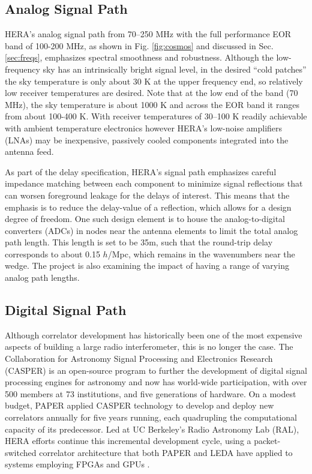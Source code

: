 \documentclass[preprint,11pt]{aastex}
\newcommand{\Mycitep}[1]{\citep{#1}}
\begin{document}
\subsection{Analog Signal Path}
HERA's analog signal path from 70--250 MHz with the full performance EOR band of 100-200 MHz, as shown in Fig. \ref{fig:cosmos} and discussed in Sec. \ref{sec:freqs}, emphasizes spectral smoothness and robustness.  Although the low-frequency sky has an intrinsically bright signal level, in the desired ``cold patches'' the sky temperature is only about 30 K at the upper frequency end, so relatively low receiver temperatures are desired.  Note that at the low end of the band (70 MHz), the sky temperature is about 1000 K and across the EOR band it ranges from about 100-400 K.
With receiver temperatures of 30--100 K readily achievable with ambient temperature electronics however
HERA's low-noise amplifiers (LNAs) may be inexpensive, passively cooled components integrated into the
antenna feed.  

As part of the delay specification,
HERA's signal path emphasizes careful impedance matching between each component to minimize signal reflections that can worsen foreground leakage for the delays of interest.  This means that the emphasis is to reduce the delay-value of a reflection, which allows for a design degree of freedom.  One such design element is to 
house the analog-to-digital converters (ADCs) in nodes near the antenna elements
to limit the total analog path length.  This length is set to be 35m, such that the round-trip delay corresponds to about 0.15 $h$/Mpc, which remains in the wavenumbers  near the wedge.  The project is also examining the impact of having a range of varying analog path lengths.



\subsection{Digital Signal Path}
\label{sec:digital}

Although correlator development has historically been one of the most 
expensive aspects of building a large radio interferometer, this is no longer the case.
The Collaboration for Astronomy Signal Processing and Electronics Research (CASPER) is an \Mycitep{parsons_et_al2006}
open-source program to further the development of digital signal processing engines for astronomy and
now has world-wide participation,
with over 500 members at 73 institutions, and 
five generations of hardware.
On a modest budget, PAPER applied CASPER technology to develop and deploy new correlators
annually for five years running, each quadrupling the computational capacity of its predecessor.
Led at UC Berkeley's Radio Astronomy Lab (RAL),
HERA efforts continue this incremental development cycle, using a packet-switched
correlator architecture \Mycitep{parsons_et_al2008} that both PAPER and LEDA \citep{2015JAI.....450003K} have
applied to systems employing FPGAs and GPUs \citep{clark_et_al2011}.
\end{document}
